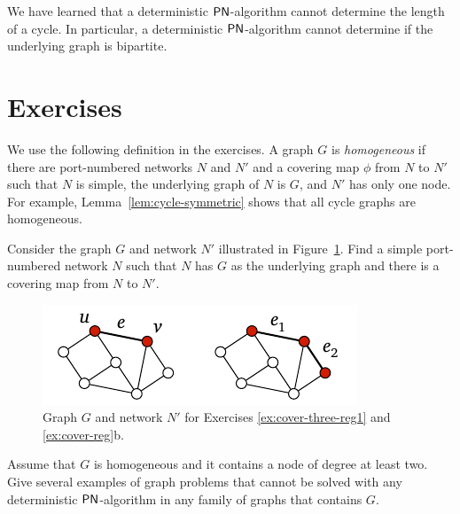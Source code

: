 We have learned that a deterministic $\textup{\sffamily PN}$-algorithm cannot determine the length of a cycle. In particular, a deterministic $\textup{\sffamily PN}$-algorithm cannot determine if the underlying graph is bipartite.


\section{Exercises}

We use the following definition in the exercises. A graph $G$ is \emph{homogeneous} if there are port-numbered networks $N$ and $N'$ and a covering map $\phi$ from $N$ to $N'$ such that $N$ is simple, the underlying graph of $N$ is $G$, and $N'$ has only one node. For example, Lemma~\ref{lem:cycle-symmetric} shows that all cycle graphs are homogeneous.

\begin{ex}\label{ex:cover-three-reg1}
    Consider the graph $G$ and network $N'$ illustrated in Figure~\ref{fig:cover-ex-three-reg}. Find a simple port-numbered network $N$ such that $N$ has $G$ as the underlying graph and there is a covering map from $N$ to $N'$.

    \begin{figure}
        \centering
        \includegraphics[page=\PCoverExThreeReg]{figs.pdf}
        \caption{Graph $G$ and network $N'$ for Exercises \ref{ex:cover-three-reg1} and \ref{ex:cover-reg}b.}\label{fig:cover-ex-three-reg}
    \end{figure}
\end{ex}

\begin{ex}[homogeneity]
    Assume that $G$ is homogeneous and it contains a node of degree at least two. Give several examples of graph problems that cannot be solved with any deterministic $\textup{\sffamily PN}$-algorithm in any family of graphs that contains $G$.
\end{ex}

